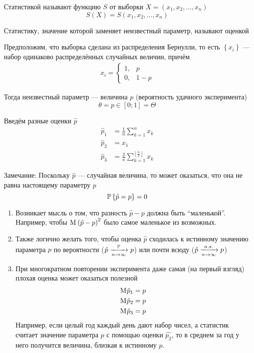 \begin{definition}[Статистика]
Статистикой называют функцию $S$ от выборки $X=\left(x_1,x_2,\dots,x_n\right)$
    $$S\left(X\right)=S\left(x_1, x_2, \dots, x_n\right)$$
\end{definition}
\begin{definition}[Оценка]Статистику,
    значение которой заменяет неизвестный параметр,
    называют оценкой
\end{definition}
\begin{example}Предположим, что выборка сделана из распределения Бернулли,
    то есть $\left\{x_i\right\}$ --- набор одинаково распределённых
    случайных величин, причём
    \begin{align*}
    x_i=
    \begin{cases}
        1,&p\\
        0,&1-p
    \end{cases}
    \end{align*}

    Тогда неизвестный параметр --- величина $p$
    (вероятность удачного эксперимента)
    $$\theta=p\in\left[0;1\right]=\Theta$$

    Введём разные оценки $\hat{p}$
    \begin{align*}
        \hat{p}_1&=\frac{1}{n}\sum_{k=1}^n x_k\\
        \hat{p}_2&=x_1\\
        \hat{p}_3&=
            \frac{2}{n}\sum_{k=1}^{\left\lfloor \frac{n}{2} \right\rfloor} x_k
    \end{align*}
\end{example}
Замечание:
Поскольку $\hat{p}$ --- случайная величина, то может оказаться,
что она не равна настоящему параметру $p$
$$\mathbb{P}\left\{ \hat{p}=p \right\}=0$$
\begin{enumerate}
    \item Возникает мысль о том, что разность $\hat{p}-p$
        должна быть ``маленькой''. Например, чтобы
        $\mathrm{M}_{} \left(\hat{p}-p\right)^2$ было самое маленькое из возможных.
    \item Также логично желать того,
        чтобы оценка $\hat{p}$ сходилась к истинному значению параметра $p$
        по вероятности ($\hat{p}\xrightarrow[n\to\infty]{\mathbb{P}} p$)
        или почти всюду ($\hat{p}\xrightarrow[n\to\infty]{a.s.} p$)
    \item При многократном повторении эксперимента
        даже самая (на первый взгляд) плохая оценка может оказаться полезной
        \begin{align*}
            \mathrm{M}_{} \hat{p}_1=p\\
            \mathrm{M}_{} \hat{p}_2=p\\
            \mathrm{M}_{} \hat{p}_3=p
        \end{align*}
        Например, если целый год каждый день дают набор чисел,
        а статистик считает значение параметра $p$ с помощью оценки $\hat{p_2}$,
        то в среднем за год у него получится величина, близкая к истинному $p$.
\end{enumerate}

